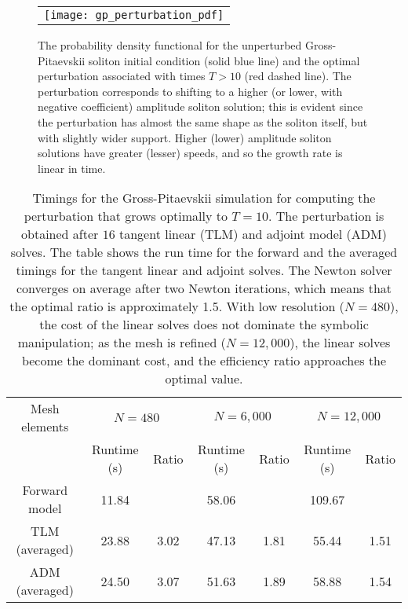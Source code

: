 \documentclass{siamltex}
\begin{document}
\begin{figure}
  \centering
  \begin{tabular}{c}
    \texttt{[image: gp\_perturbation\_pdf]}
  \end{tabular}
  \caption{The probability density functional for the unperturbed
    Gross-Pitaevskii soliton initial condition (solid blue line) and
    the optimal perturbation associated with times $T > 10$ (red
    dashed line). The perturbation corresponds to shifting to a higher
    (or lower, with negative coefficient) amplitude soliton solution;
    this is evident since the perturbation has almost the same shape
    as the soliton itself, but with slightly wider support. Higher
    (lower) amplitude soliton solutions have greater (lesser) speeds,
    and so the growth rate is linear in time.}
  \label{fig:gp_pdfs}
\end{figure}
\begin{table}[t]
\centering
\begin{tabular}{c|cc|cc|cc}
\toprule
Mesh elements & \multicolumn{2}{|c|}{$N = 480$} & \multicolumn{2}{|c}{$N = 6,000$} & \multicolumn{2}{|c}{$N = 12,000$} \\ & Runtime (s) & Ratio  & Runtime (s) & Ratio & Runtime (s) & Ratio \\ 
\midrule
Forward model & 11.84 &  & 58.06 & & 109.67  \\ 
TLM (averaged) & 23.88 & 3.02 & 47.13 & 1.81 & 55.44 & 1.51 \\ 
      ADM (averaged) & 24.50 & 3.07 & 51.63 & 1.89 & 58.88 & 1.54 \\ 
\bottomrule
\end{tabular}
\caption{Timings for the Gross-Pitaevskii simulation for computing the perturbation that grows optimally to $T = 10$. 
  The perturbation is obtained after $16$ tangent linear (TLM) and adjoint model (ADM) solves. 
 The table shows the run time for the forward and the averaged timings for the tangent linear and adjoint solves.
 The Newton solver converges on average after two Newton iterations, which means that the optimal ratio is approximately 1.5.
 With low resolution ($N = 480$), the cost of the linear solves does not dominate the symbolic
 manipulation; as the mesh is refined ($N = 12,000$), the linear solves become the
 dominant cost, and the efficiency ratio approaches the optimal value.
} 
\label{tab:gross-pitaevskii-timings}
\end{table}
\end{document}
